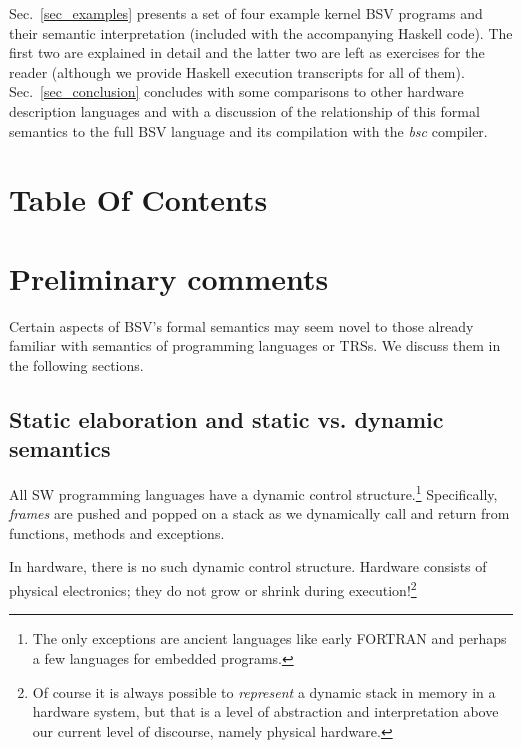 \documentclass[11pt]{article}
\begin{document}
Sec.~\ref{sec_examples} presents a set of four example kernel BSV
programs and their semantic interpretation (included with the
accompanying Haskell code).  The first two are explained in detail and
the latter two are left as exercises for the reader (although we
provide Haskell execution transcripts for all of them).
Sec.~\ref{sec_conclusion} concludes with some comparisons to other
hardware description languages and with a discussion of the
relationship of this formal semantics to the full BSV language and its
compilation with the \emph{bsc} compiler.


\renewcommand*{\contentsname}{}

\section{Table Of Contents}

\tableofcontents

\hspace*{1em}


\section{Preliminary comments}

\label{sec_prelims}

Certain aspects of BSV's formal semantics may seem novel to those
already familiar with semantics of programming languages or TRSs.  We
discuss them in the following sections.


\subsection{Static elaboration and static vs. dynamic semantics}

All SW programming languages have a dynamic control
structure.\footnote{The only exceptions are ancient languages like
early FORTRAN and perhaps a few languages for embedded programs.}
Specifically, \emph{frames} are pushed and popped on a stack as we
dynamically call and return from functions, methods and exceptions.

In hardware, there is no such dynamic control structure.  Hardware
consists of physical electronics; they do not grow or shrink during
execution!\footnote{Of course it is always possible to
\emph{represent} a dynamic stack in memory in a hardware system, but
that is a level of abstraction and interpretation above our current
level of discourse, namely physical hardware.}
\end{document}
